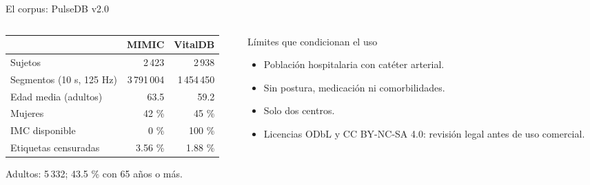 \documentclass[aspectratio=169]{beamer}
\begin{document}
\begin{frame}{El corpus: PulseDB v2.0}
  \begin{columns}[T]
    \begin{column}{0.52\textwidth}
      \small
      \begin{tabular}{lrr}
        \toprule
        & MIMIC & VitalDB \\
        \midrule
        Sujetos & 2\,423 & 2\,938 \\
        Segmentos (10 s, 125 Hz) & 3\,791\,004 & 1\,454\,450 \\
        Edad media (adultos) & 63.5 & 59.2 \\
        Mujeres & 42 \% & 45 \% \\
        IMC disponible & 0 \% & 100 \% \\
        Etiquetas censuradas & 3.56 \% & 1.88 \% \\
        \bottomrule
      \end{tabular}

      \vspace{0.6em}
      Adultos: 5\,332; 43.5 \% con 65 años o más.
    \end{column}
    \begin{column}{0.44\textwidth}
      \begin{block}{Límites que condicionan el uso}
        \small
        \begin{itemize}
          \item Población hospitalaria con catéter arterial.
          \item Sin postura, medicación ni comorbilidades.
          \item Solo dos centros.
          \item Licencias ODbL y CC BY-NC-SA 4.0: revisión legal antes de uso comercial.
        \end{itemize}
      \end{block}
    \end{column}
  \end{columns}
\end{frame}
\end{document}
